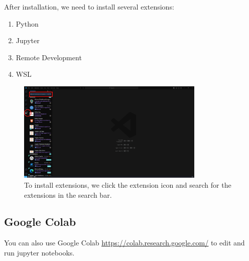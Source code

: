After installation, we need to install several extensions:
\begin{enumerate}
    \item Python
    \item Jupyter
    \item Remote Development
    \item WSL
\end{enumerate}
\begin{figure}[ht]
    \centering
    \includegraphics[width=0.8\textwidth]{./image/vscode-extensions.png}
    \caption{To install extensions, we click the extension icon and search for the extensions in the search bar.}
\end{figure}

\subsection{Google Colab}
You can also use Google Colab \href{https://colab.research.google.com/}{\color{blue}\underline{https://colab.research.google.com/}} to edit and run jupyter notebooks.
